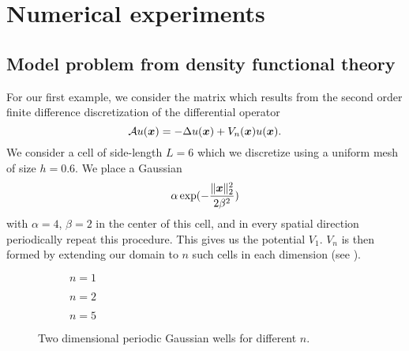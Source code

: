 \chapter{Numerical experiments}
\label{chp:5-experiments}


\section{Model problem from density functional theory}
\label{sec:5-experiments-density-function}

For our first example, we consider the matrix which results from the second order
finite difference discretization of the differential operator
\begin{equation}
    \mathcal{A} u(\boldsymbol{x}) = - \Delta u(\boldsymbol{x}) + V_n(\boldsymbol{x}) u(\boldsymbol{x}).
    \label{equ:5-experiments-electronic-hamiltonian}
\end{equation}
We consider a cell of side-length $L=6$ which we discretize using a uniform
mesh of size $h=0.6$. We place a Gaussian
\begin{equation}
    \alpha \exp(-\frac{\lVert \boldsymbol{x} \rVert _2^2}{ 2 \beta^2 })
    \label{equ:5-experiments-gaussian-cell}
\end{equation}
with $\alpha = 4$, $\beta = 2$ in the center of this cell, and in every
spatial direction periodically repeat this procedure. This gives us the potential
$V_1$. $V_n$ is then formed by extending our domain to $n$ such cells in each
dimension (see ). 
\begin{figure}[ht]
    \begin{subfigure}[b]{0.33\columnwidth}
        
        \caption{$n=1$}
        \label{fig:5-experiments-periodic-gaussian-well-1}
    \end{subfigure}
    \begin{subfigure}[b]{0.33\columnwidth}
        
        \caption{$n=2$}
        \label{fig:5-experiments-periodic-gaussian-well-2}
    \end{subfigure}
    \begin{subfigure}[b]{0.33\columnwidth}
        
        \caption{$n=5$}
        \label{fig:5-experiments-periodic-gaussian-well-5}
    \end{subfigure}
    \caption{Two dimensional periodic Gaussian wells for different $n$.}
    \label{fig:5-experiments-periodic-gaussian-well}
\end{figure}

